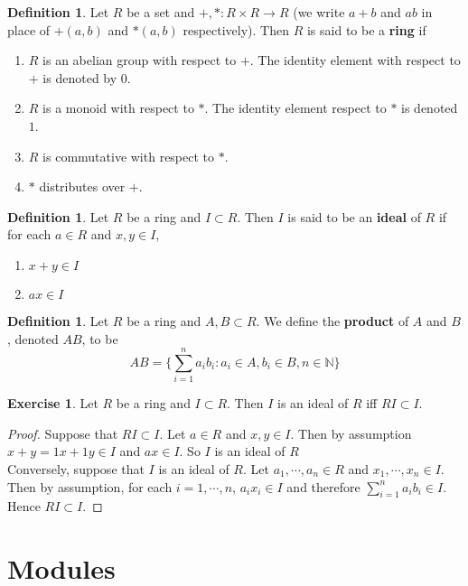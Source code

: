 \documentclass[12pt]{amsart}
\theoremstyle{definition}
\newtheorem{defn}[definition]{Definition}
\theoremstyle{remark}
\theoremstyle{definition}
\newtheorem{ex}[definition]{Exercise}
\newcommand{\N}{\mathbb{N}}
\begin{document}
	\begin{defn}
	Let $R$ be a set and $+, *: R \times R 				
	\rightarrow R$ (we write $a+b$ and 
	$ab$ in place of $+(a,b)$ and $*(a,b)$ respectively).
	Then $R$ is said to be a \textbf{ring} if 
	\begin{enumerate}
	\item $R$ is an abelian group with respect to $+$.
	 The identity element with respect to $+$ is denoted
	 by $0$.
	\item $R$ is a monoid with respect to $*$. The  
	identity element respect to $*$ is denoted $1$. 
	\item $R$ is commutative with respect to $*$.
	\item $*$ distributes over $+$.
	\end{enumerate}
	\end{defn}
	
	\begin{defn}
	Let $R$ be a ring and $I \subset R$. Then $I$ is said 
	to be an \textbf{ideal} of $R$ if for each $a \in R$ and $x,y \in I$,
	\begin{enumerate}
	\item  $x + y \in I$
	\item  $ax \in I$
	\end{enumerate}
	\end{defn}
	
	\begin{defn}
	Let $R$ be a ring and $A,B \subset R$. We define the \textbf{product} of $A$ and $B$, denoted $AB$, to be $$AB = \bigg \{\sum_{i=1}^n a_ib_i: a_i \in A, b_i \in B, n \in \N \bigg \}$$
	\end{defn}	
	
	\begin{ex}
	Let $R$ be a ring and $I \subset R$. Then $I$ is an ideal of $R$ iff $RI \subset I$. 
	\end{ex}
	
	\begin{proof}
	Suppose that $RI \subset I$. Let $a \in R$ and $x,y \in I$. Then by assumption $x + y = 1x + 1y \in I$ and $ax \in I$. So $I$ is an ideal of $R$\\
	Conversely, suppose that $I$ is an ideal of $R$. Let $a_1, \cdots, a_n \in R$ and $x_1, \cdots, x_n \in I$. Then by assumption, for each $i = 1, \cdots, n$, $a_ix_i \in I$ and therefore $\sum\limits_{i=1}^n a_ib_i \in I$. Hence $RI \subset I$.
	\end{proof}
	
	\section{Modules}
	
\end{document}

